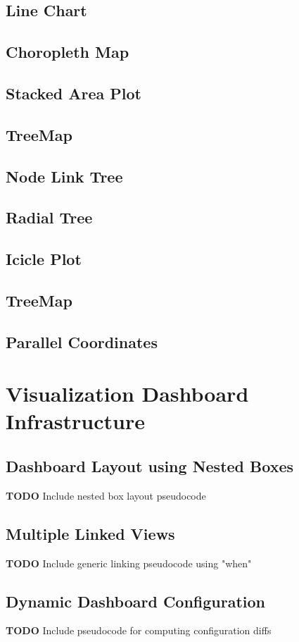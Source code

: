 \documentclass[12pt]{report}
\newcommand{\TODO}[1]{{ \color{red}\textbf{TODO} #1 }}
\begin{document}
\begin{doublespace}
\section{Line Chart}
\section{Choropleth Map}
\section{Stacked Area Plot}
\section{TreeMap}
\section{Node Link Tree}
\section{Radial Tree}
\section{Icicle Plot}
\section{TreeMap}
\section{Parallel Coordinates}


\chapter{Visualization Dashboard Infrastructure}
\section{Dashboard Layout using Nested Boxes}
\TODO{Include nested box layout pseudocode}
\section{Multiple Linked Views}
\TODO{Include generic linking pseudocode using "when"}
\section{Dynamic Dashboard Configuration}
\TODO{Include pseudocode for computing configuration diffs}


\end{doublespace}
\end{document}
